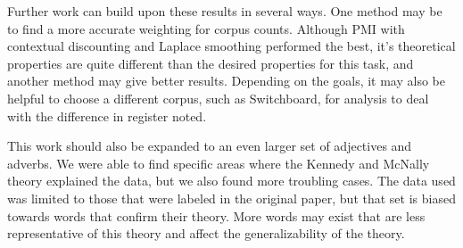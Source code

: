 \documentclass[11pt]{article}
\begin{document}
Further work can build upon these results in several ways. One method may be to find a more accurate weighting for corpus counts. Although PMI with contextual discounting and Laplace smoothing performed the best, it's theoretical properties are quite different than the desired properties for this task, and another method may give better results. Depending on the goals, it may also be helpful to choose a different corpus, such as Switchboard, for analysis to deal with the difference in register noted.

This work should also be expanded to an even larger set of adjectives and adverbs. We were able to find specific areas where the Kennedy and McNally theory explained the data, but we also found more troubling cases. The data used was limited to those that were labeled in the original paper, but that set is biased towards words that confirm their theory. More words may exist that are less representative of this theory and affect the generalizability of the theory.



\end{document}
